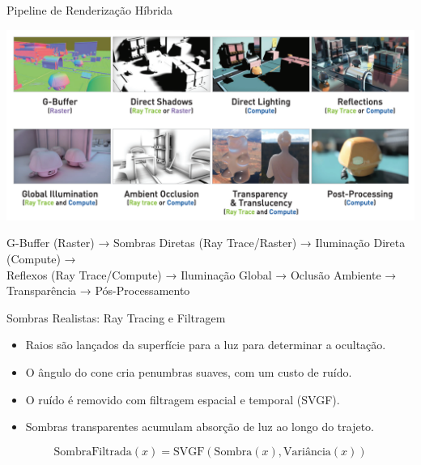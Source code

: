 \documentclass[aspectratio=169,xcolor=table]{beamer}
\begin{document}
\begin{frame}{Pipeline de Renderização Híbrida}
    \begin{center}
        \includegraphics[height=0.65\textheight]{pipeline}
    \end{center}
    \begin{center}
        \small{G-Buffer (Raster) → Sombras Diretas (Ray Trace/Raster) → Iluminação Direta (Compute) → \\
        Reflexos (Ray Trace/Compute) → Iluminação Global → Oclusão Ambiente → Transparência → Pós-Processamento}
    \end{center}
\end{frame}

\begin{frame}{Sombras Realistas: Ray Tracing e Filtragem}
    \begin{itemize}
        \item Raios são lançados da superfície para a luz para determinar a ocultação.
        \item O ângulo do cone cria penumbras suaves, com um custo de ruído.
        \item O ruído é removido com filtragem espacial e temporal (SVGF).
        \item Sombras transparentes acumulam absorção de luz ao longo do trajeto.
    \end{itemize}
    \begin{equation*}
        \text{SombraFiltrada}(x) = \text{SVGF}(\text{Sombra}(x), \text{Variância}(x))
    \end{equation*}
\end{frame}
\end{document}
